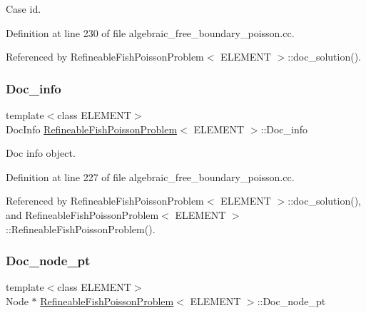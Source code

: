 Case id. 



Definition at line 230 of file algebraic\+\_\+free\+\_\+boundary\+\_\+poisson.\+cc.



Referenced by Refineable\+Fish\+Poisson\+Problem$<$ E\+L\+E\+M\+E\+N\+T $>$\+::doc\+\_\+solution().

\mbox{\label{classRefineableFishPoissonProblem_ad6d382f1d38425323627f34e0559b28f}} 
\subsubsection{\texorpdfstring{Doc\+\_\+info}{Doc\_info}}
{\footnotesize\ttfamily template$<$class E\+L\+E\+M\+E\+NT$>$ \\
Doc\+Info \hyperlink{classRefineableFishPoissonProblem}{Refineable\+Fish\+Poisson\+Problem}$<$ E\+L\+E\+M\+E\+NT $>$\+::Doc\+\_\+info\hspace{0.3cm}{\ttfamily [private]}}



Doc info object. 



Definition at line 227 of file algebraic\+\_\+free\+\_\+boundary\+\_\+poisson.\+cc.



Referenced by Refineable\+Fish\+Poisson\+Problem$<$ E\+L\+E\+M\+E\+N\+T $>$\+::doc\+\_\+solution(), and Refineable\+Fish\+Poisson\+Problem$<$ E\+L\+E\+M\+E\+N\+T $>$\+::\+Refineable\+Fish\+Poisson\+Problem().

\mbox{\label{classRefineableFishPoissonProblem_a5dce47aa14fdbc33d8a865f4f4b1e1ea}} 
\subsubsection{\texorpdfstring{Doc\+\_\+node\+\_\+pt}{Doc\_node\_pt}}
{\footnotesize\ttfamily template$<$class E\+L\+E\+M\+E\+NT$>$ \\
Node $\ast$ \hyperlink{classRefineableFishPoissonProblem}{Refineable\+Fish\+Poisson\+Problem}$<$ E\+L\+E\+M\+E\+NT $>$\+::Doc\+\_\+node\+\_\+pt\hspace{0.3cm}{\ttfamily [private]}}



